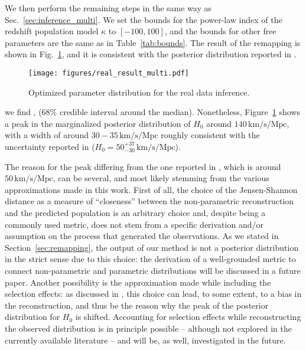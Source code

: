 \documentclass[sn-aps, pdflatex, iicol]{sn-jnl}
\begin{document}
We then perform the remaining steps in the same way as Sec.~\ref{sec:inference_multi}.
We set the bounds for the power-law index of the redshift population model $\kappa$ to $[-100, 100]$, and the bounds for other free parameters are the same as in Table~\ref{tab:bounds}.
The result of the remapping is shown in Fig.~\ref{fig:real_result_multi}, and it is consistent with the posterior distribution reported in \cite{LIGOScientific:2021aug}.
\begin{figure}
    \texttt{[image: figures/real\_result\_multi.pdf]}
    \caption{
        Optimized parameter distribution for the real data inference.
    }
    \label{fig:real_result_multi}
\end{figure}
we find , (68\% credible interval around the median). Nonetheless, Figure~\ref{fig:real_result_multi} shows a peak in the marginalized posterior distribution of $H_0$ around $140\, \mathrm{km/s/Mpc}$, with a width of around $30-35\, \mathrm{km/s/Mpc}$ roughly consistent with the uncertainty reported in \cite{LIGOScientific:2021aug} ($H_0 = 50^{+37}_{-30} \, \mathrm{km/s/Mpc}$).

The reason for the peak differing from the one reported in \cite{LIGOScientific:2021aug}, which is around $50\, \mathrm{km/s/Mpc}$, can be several, and most likely stemming from the various approximations made in this work. First of all, the choice of the Jensen-Shannon distance as a measure of ``closeness'' between the non-parametric reconstruction and the predicted population is an arbitrary choice and, despite being a commonly used metric, does not stem from a specific derivation and/or assumption on the process that generated the observations. As we stated in Section~\ref{sec:remapping}, the output of our method is not a posterior distribution in the strict sense due to this choice: the derivation of a well-grounded metric to connect non-parametric and parametric distributions will be discussed in a future paper. Another possibility is the approximation made while including the selection effects: as discussed in \cite{Essick:2023upv}, this choice can lead, to some extent, to a bias in the reconstruction, and thus be the reason why the peak of the posterior distribution for $H_0$ is shifted. Accounting for selection effects while reconstructing the observed distribution is in principle possible -- although not explored in the currently available literature -- and will be, as well, investigated in the future.
\end{document}
